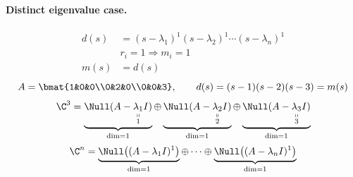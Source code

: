 \paragraph{Distinct eigenvalue case.}
\begin{align*}
d(s)&=(s-\lambda_1)^1(s-\lambda_2)^1\cdots(s-\lambda_n)^1\\
&r_i=1\Rightarrow m_i=1\\
m(s)&=d(s)
\end{align*}
\[
A=\bmat{1&0&0\\0&2&0\\0&0&3},\qquad d(s)=(s-1)(s-2)(s-3)=m(s)
\]
\[
\C^3=\underbrace{\Null(A-\underset{\substack{\shortparallel\\1}}{\lambda_1}I)}_{\dim=1}
\oplus\underbrace{\Null(A-\underset{\substack{\shortparallel\\2}}{\lambda_2}I)}_{\dim=1}
\oplus\underbrace{\Null(A-\underset{\substack{\shortparallel\\3}}{\lambda_3}I)}_{\dim=1}
\]
\[
\C^n=\underbrace{\Null\big((A-\lambda_1I)^1\big)}_{\dim=1}\oplus\cdots\oplus\underbrace{\Null\big((A-\lambda_nI)^1\big)}_{\dim=1}
\]

